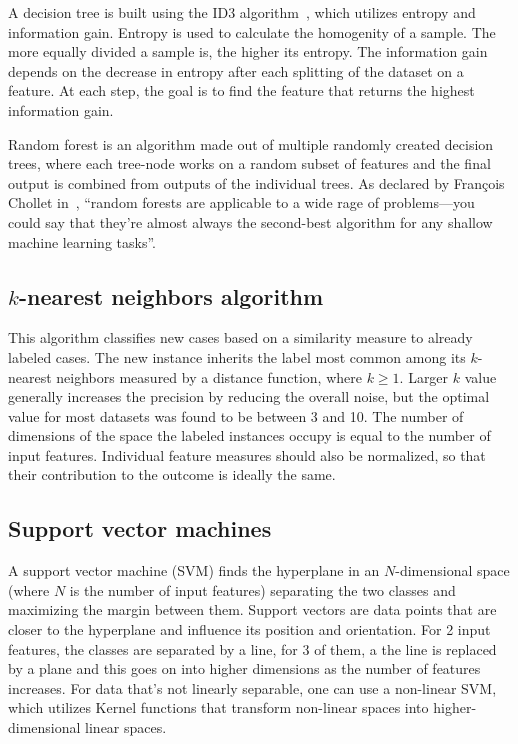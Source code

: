 A decision tree is built using the ID3 algorithm~\cite{quinlan1986induction},
which utilizes entropy and information gain.
Entropy is used to calculate the homogenity of a sample. The more equally divided a sample is,
the higher its entropy. The information gain depends on the decrease in entropy
after each splitting of the dataset on a feature. At each step,
the goal is to find the feature that returns the highest information gain.

Random forest is an algorithm made out of multiple randomly created decision trees,
where each tree-node works on a random subset of features and the final output
is combined from outputs of the individual trees.
As declared by Fran\c{c}ois Chollet in~\cite[p. 16]{Deep-learning-with-Python}, ``random forests are applicable to
a wide rage of problems---you could say that they're almost always
the second-best algorithm for any shallow machine learning tasks''.


\subsection*{$k$-nearest neighbors algorithm}
\label{k-nearest-neighbors-algorithm}
This algorithm classifies new cases based on a similarity measure to already labeled cases.
The new instance inherits the label most common among its $k$-nearest neighbors
measured by a distance function, where $ k \geq 1 $.
Larger $k$ value generally increases the precision by reducing the overall noise,
but the optimal value for most datasets was found to be between 3 and 10.
The number of dimensions of the space the labeled instances occupy
is equal to the number of input features.
Individual feature measures should also be normalized,
so that their contribution to the outcome is ideally the same.



\subsection*{Support vector machines}
\label{support-vector-machines}
A support vector machine (SVM) finds the hyperplane in an $N$-dimensional space
(where $N$ is the number of input features) separating the two classes
and maximizing the margin between them.
Support vectors are data points
that are closer to the hyperplane and influence its position and orientation.
For 2 input features, the classes are separated by a line,
for 3 of them, a the line is replaced by a plane and this goes on
into higher dimensions as the number of features increases.
For data that's not linearly separable,  one can use a non-linear SVM,
which utilizes Kernel functions that transform non-linear spaces into higher-dimensional linear spaces.



